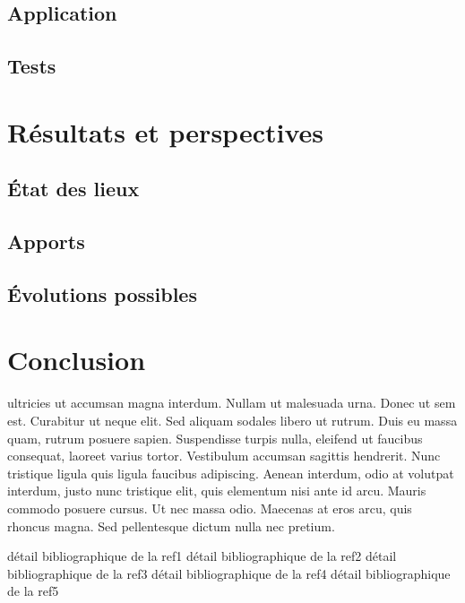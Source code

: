 \documentclass{EPUProjetDi}
\begin{document}
\section{Application}

\section{Tests}

\chapter{Résultats et perspectives}

\section{État des lieux}
\section{Apports}

\section{Évolutions possibles}


\chapter*{Conclusion}
 ultricies ut accumsan magna interdum. Nullam ut malesuada urna. Donec ut sem est. Curabitur ut neque elit. Sed aliquam sodales libero ut rutrum. Duis eu massa quam, rutrum posuere sapien. Suspendisse turpis nulla, eleifend ut faucibus consequat, laoreet varius tortor. Vestibulum accumsan sagittis hendrerit. Nunc tristique ligula quis ligula faucibus adipiscing. Aenean interdum, odio at volutpat interdum, justo nunc tristique elit, quis elementum nisi ante id arcu. Mauris commodo posuere cursus. Ut nec massa odio. Maecenas at eros arcu, quis rhoncus magna. Sed pellentesque dictum nulla nec pretium.

\begin{thebibliography}{99}
\label{sec:biblio}
  détail bibliographique de la ref1
  détail bibliographique de la ref2
  détail bibliographique de la ref3
  détail bibliographique de la ref4
  détail bibliographique de la ref5
\end{thebibliography}
\end{document}
